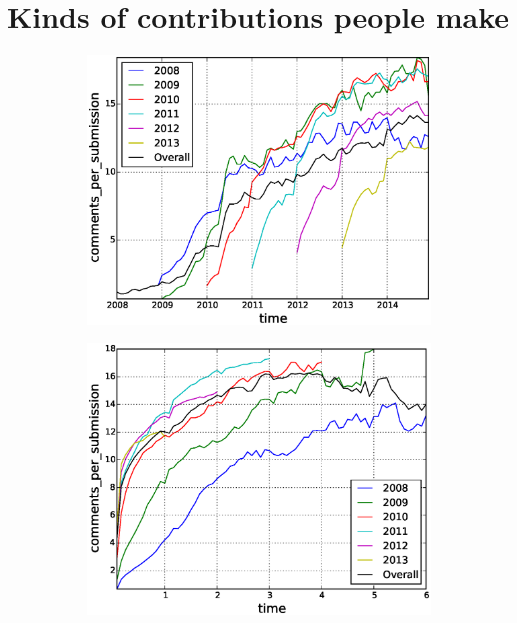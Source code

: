 
\section{Kinds of contributions people make}

\begin{figure}[!tb]
\centering
\begin{subfigure}{.49\textwidth}\includegraphics[scale=0.4]{./images/comments_per_submissions_over_time_cohorts.eps}\caption{}\end{subfigure}
\begin{subfigure}{.49\textwidth}\includegraphics[scale=0.4]{./images/comments_per_submissions_cohorts.eps}\caption{}\end{subfigure}

\end{figure}
